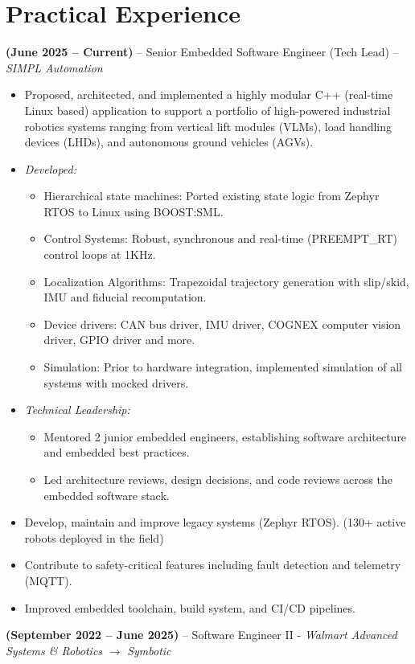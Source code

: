 \documentclass[11pt,a4paper]{article}
\newcommand{\jobentry}[2]{
  \vspace{0.5\baselineskip}\textbf{#1} -- #2 
}
\begin{document}
\section*{Practical Experience}
\jobentry{(June 2025 -- Current)}{Senior Embedded Software Engineer (Tech Lead) -- \textit{SIMPL Automation}}
\begin{itemize}
  \item Proposed, architected, and implemented a highly modular C++ (real-time Linux based) application to support a portfolio of high-powered industrial robotics systems ranging from vertical lift modules (VLMs), load handling devices (LHDs), and autonomous ground vehicles (AGVs).
\item \textit{Developed:}
  \begin{itemize}
    \item Hierarchical state machines: Ported existing state logic from Zephyr RTOS to Linux using BOOST:SML.
    \item Control Systems: Robust, synchronous and real-time (PREEMPT\_RT) control loops at 1KHz.
    \item Localization Algorithms: Trapezoidal trajectory generation with slip/skid, IMU and fiducial recomputation.
    \item Device drivers: CAN bus driver, IMU driver, COGNEX computer vision driver, GPIO driver and more.
    \item Simulation: Prior to hardware integration, implemented simulation of all systems with mocked drivers.
  \end{itemize}

\item \textit{Technical Leadership:}
  \begin{itemize}
  \item Mentored 2 junior embedded engineers, establishing software architecture and embedded best practices.
  \item Led architecture reviews, design decisions, and code reviews across the embedded software stack.
  \end{itemize}
\item Develop, maintain and improve legacy systems (Zephyr RTOS). (130+ active robots deployed in the field)
\item Contribute to safety-critical features including fault detection and telemetry (MQTT).
\item Improved embedded toolchain, build system, and CI/CD pipelines.
\end{itemize}
\jobentry{(September 2022 -- June 2025)}{Software Engineer II - \textit{Walmart Advanced Systems \& Robotics}  $\rightarrow$  \textit{Symbotic}}
\end{document}

